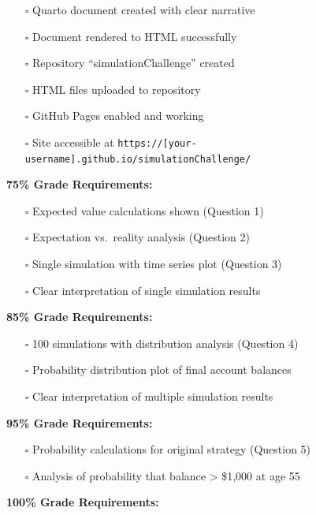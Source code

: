 \documentclass[
  letterpaper,
  DIV=11,
  numbers=noendperiod]{scrartcl}
\providecommand{\tightlist}{%
  \setlength{\itemsep}{0pt}\setlength{\parskip}{0pt}}
\theoremstyle{definition}
\theoremstyle{remark}
\begin{document}
\begin{itemize}
\tightlist
\item[$\square$]
  Quarto document created with clear narrative
\item[$\square$]
  Document rendered to HTML successfully
\item[$\square$]
  Repository ``simulationChallenge'' created
\item[$\square$]
  HTML files uploaded to repository
\item[$\square$]
  GitHub Pages enabled and working
\item[$\square$]
  Site accessible at
  \texttt{https://{[}your-username{]}.github.io/simulationChallenge/}
\end{itemize}

\textbf{75\% Grade Requirements:}

\begin{itemize}
\tightlist
\item[$\square$]
  Expected value calculations shown (Question 1)
\item[$\square$]
  Expectation vs.~reality analysis (Question 2)
\item[$\square$]
  Single simulation with time series plot (Question 3)
\item[$\square$]
  Clear interpretation of single simulation results
\end{itemize}

\textbf{85\% Grade Requirements:}

\begin{itemize}
\tightlist
\item[$\square$]
  100 simulations with distribution analysis (Question 4)
\item[$\square$]
  Probability distribution plot of final account balances
\item[$\square$]
  Clear interpretation of multiple simulation results
\end{itemize}

\textbf{95\% Grade Requirements:}

\begin{itemize}
\tightlist
\item[$\square$]
  Probability calculations for original strategy (Question 5)
\item[$\square$]
  Analysis of probability that balance \textgreater{} \$1,000 at age 55
\end{itemize}

\textbf{100\% Grade Requirements:}
\end{document}
